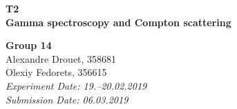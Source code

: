 


	
\begin{titlepage}
	\thispagestyle{empty}
	
%
%
%
	
	\hspace{0pt}
	\vspace{2cm}
	\begin{center}
		\hdashrule{\linewidth}{1pt}{}
		\vskip -0.5cm
		\hdashrule{\linewidth}{0.5pt}{}
		
		\vspace{0.5cm}
		\Huge{ \textbf{ T2 \\}}
		\LARGE{ \textbf{Gamma spectroscopy and Compton scattering } } 
		
		\hdashrule{\linewidth}{0.5pt}{}
		\vskip -0.95cm
		\hdashrule{\linewidth}{1pt}{}
		
		\vspace{3cm}
		\Large{\textbf{ Group 14 \\}}
		\Large{Alexandre Drouet, 358681 \\ Olexiy Fedorets, 356615 \\}
		\vspace{1cm}
		\Large{\textsl{ Experiment Date: 19.--20.02.2019 \\ Submission Date: 06.03.2019}}

		

		
	\end{center}
	\vfill
	
\end{titlepage}
	
	
	
\skippage
{}
\thispagestyle{plain}

\tableofcontents
\newpage
\listoffigures

\listoftables

\skippage

\setcounter{page}{1}
\restoregeometry
\thispagestyle{fancy}



	
	

